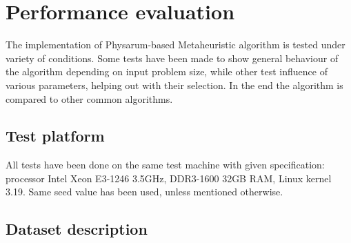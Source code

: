 \section{Performance evaluation}
\label{section:project_evaluation}

The implementation of Physarum-based Metaheuristic algorithm is tested under variety of conditions. Some tests have been made to show general behaviour of the algorithm depending on input problem size, while other test influence of various parameters, helping out with their selection. In the end the algorithm is compared to other common algorithms.

\subsection{Test platform}

All tests have been done on the same test machine with given specification: processor Intel Xeon E3-1246 3.5GHz, DDR3-1600 32GB RAM, Linux kernel 3.19. Same seed value has been used, unless mentioned otherwise.

\subsection{Dataset description}



